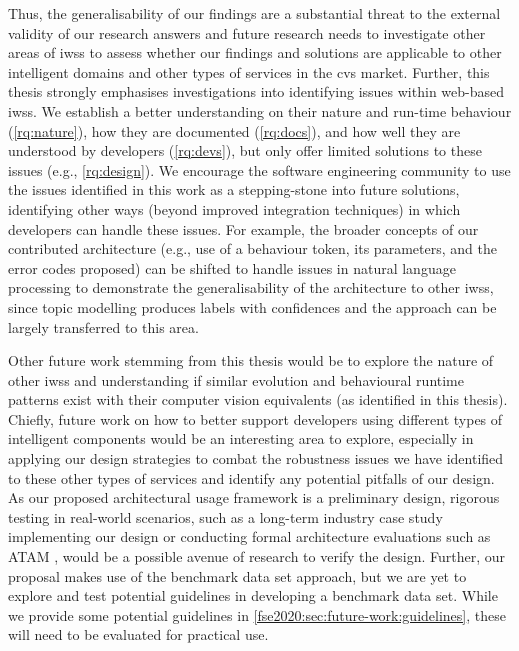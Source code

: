 Thus, the generalisability of our findings are a substantial threat to the external validity of our research answers and future research needs to investigate other areas of \glspl{iws} to assess whether our findings and solutions are applicable to other intelligent domains and other types of services in the \gls{cvs} market. Further, this thesis strongly emphasises investigations into identifying issues within web-based \glspl{iws}. We establish a better understanding on their nature and run-time behaviour  (\ref{rq:nature}), how they are documented (\ref{rq:docs}), and how well they are understood by developers (\ref{rq:devs}), but only offer limited solutions to these issues (e.g., \ref{rq:design}). We encourage the software engineering community to use the issues identified in this work as a stepping-stone into future solutions, identifying other ways (beyond improved integration techniques) in which developers can handle these issues. For example, the broader concepts of our contributed architecture (e.g., use of a behaviour token, its parameters, and the error codes proposed) can be shifted to handle issues in natural language processing to demonstrate the generalisability of the architecture to other \glspl{iws}, since topic modelling produces labels with confidences and the approach can be largely transferred to this area.

Other future work stemming from this thesis would be to explore the nature of other \glspl{iws} and understanding if similar evolution and behavioural runtime patterns exist with their computer vision equivalents (as identified in this thesis). Chiefly, future work on how to better support developers using different types of intelligent components would be an interesting area to explore, especially in applying our design strategies to combat the robustness issues we have identified to these other types of services and identify any potential pitfalls of our design. As our proposed architectural usage framework is a preliminary design, rigorous testing in real-world scenarios, such as a long-term industry case study implementing our design or conducting formal architecture evaluations such as ATAM \citep{Kazman2000}, would be a possible avenue of research to verify the design. Further, our proposal makes use of the benchmark data set approach, but we are yet to explore and test potential guidelines in developing a benchmark data set. While we provide some potential guidelines in \cref{fse2020:sec:future-work:guidelines}, these will need to be evaluated for practical use.

